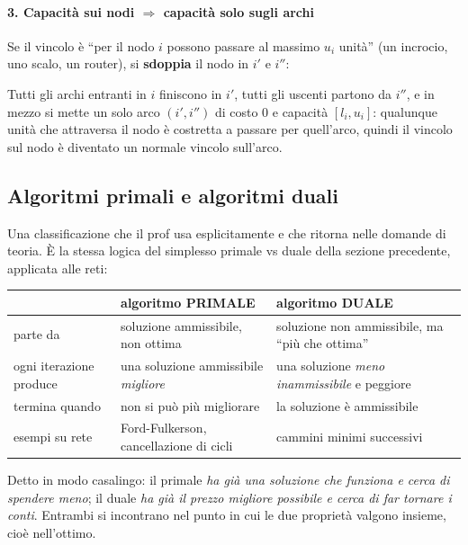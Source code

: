 \documentclass[12pt]{extarticle} %
\begin{document}
\paragraph{3. Capacità sui nodi $\Rightarrow$ capacità solo sugli archi}
Se il vincolo è ``per il nodo $i$ possono passare al massimo $u_i$ unità'' (un incrocio, uno scalo, un router), si \textbf{sdoppia} il nodo in $i'$ e $i''$:
\begin{center}
\end{center}
Tutti gli archi entranti in $i$ finiscono in $i'$, tutti gli uscenti partono da $i''$, e in mezzo si mette un solo arco $(i',i'')$ di costo 0 e capacità $[l_i,u_i]$: qualunque unità che attraversa il nodo è costretta a passare per quell'arco, quindi il vincolo sul nodo è diventato un normale vincolo sull'arco.

\subsection{Algoritmi primali e algoritmi duali}
Una classificazione che il prof usa esplicitamente e che ritorna nelle domande di teoria. È la stessa logica del simplesso primale vs duale della sezione precedente, applicata alle reti:
\begin{center}
\begin{tabular}{lll}
\hline
 & \textbf{algoritmo PRIMALE} & \textbf{algoritmo DUALE} \\
\hline
parte da & soluzione ammissibile, non ottima & soluzione non ammissibile, ma ``più che ottima'' \\
ogni iterazione produce & una soluzione ammissibile \emph{migliore} & una soluzione \emph{meno inammissibile} e peggiore \\
termina quando & non si può più migliorare & la soluzione è ammissibile \\
esempi su rete & Ford-Fulkerson, cancellazione di cicli & cammini minimi successivi \\
\hline
\end{tabular}
\end{center}
\noindent Detto in modo casalingo: il primale \emph{ha già una soluzione che funziona e cerca di spendere meno}; il duale \emph{ha già il prezzo migliore possibile e cerca di far tornare i conti}. Entrambi si incontrano nel punto in cui le due proprietà valgono insieme, cioè nell'ottimo.
\end{document}
